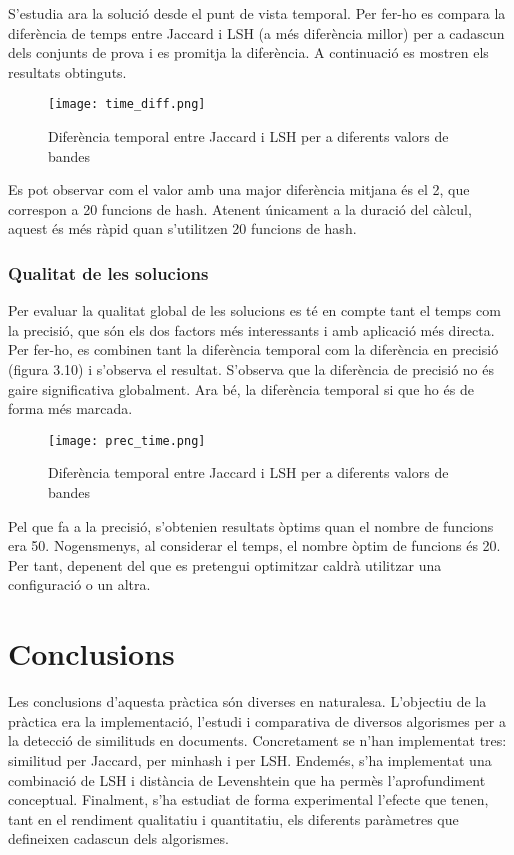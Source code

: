 \documentclass[catalan, 12pt]{report}
\begin{document}
S'estudia ara la solució desde el punt de vista temporal. Per fer-ho es compara la diferència de temps entre Jaccard i LSH (a més diferència millor) per a cadascun dels conjunts de prova i es promitja la diferència. A continuació es mostren els resultats obtinguts.

\begin{figure}[!h]
  \centering
  \texttt{[image: time\_diff.png]}
  \centering
  \caption[Caption for LOF]{Diferència temporal entre Jaccard i LSH per a diferents valors de bandes\protect}
\end{figure}


Es pot observar com el valor amb una major diferència mitjana és el 2, que correspon a 20 funcions de hash. Atenent únicament a la duració del càlcul, aquest és més ràpid quan s'utilitzen 20 funcions de hash. \newline

\newpage
\subsection{Qualitat de les solucions}
\vspace{20pt}
Per evaluar la qualitat global de les solucions es té en compte tant el temps com la precisió, que són els dos factors més interessants i amb aplicació més directa. Per fer-ho, es combinen tant la diferència temporal com la diferència en precisió (figura 3.10) i s'observa el resultat. S'observa que la diferència de precisió no és gaire significativa globalment. Ara bé, la diferència temporal si que ho és de forma més marcada. 


\begin{figure}[!h]
  \centering
  \texttt{[image: prec\_time.png]}
  \centering
  \caption[Caption for LOF]{Diferència temporal entre Jaccard i LSH per a diferents valors de bandes\protect}
\end{figure}

Pel que fa a la precisió, s'obtenien resultats òptims quan el nombre de funcions era 50. Nogensmenys, al considerar el temps, el nombre òptim de funcions és 20. Per tant, depenent del que es pretengui optimitzar caldrà utilitzar una configuració o un altra.

\chapter{Conclusions}

Les conclusions d'aquesta pràctica són diverses en naturalesa. L'objectiu de la pràctica era la implementació, l'estudi i comparativa de diversos algorismes per a la detecció de similituds en documents. Concretament se n'han implementat tres: similitud per Jaccard, per minhash i per LSH. Endemés, s'ha implementat una combinació de LSH i distància de Levenshtein que ha permès l'aprofundiment conceptual. Finalment, s'ha estudiat de forma experimental l'efecte que tenen, tant en el rendiment qualitatiu i quantitatiu, els diferents paràmetres que defineixen cadascun dels algorismes. \newline
\end{document}
